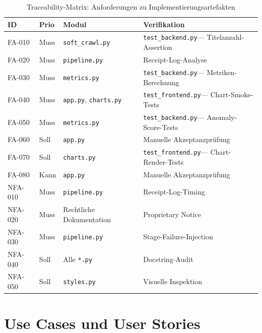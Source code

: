 \documentclass[12pt, a4paper, oneside]{report}
\newcommand{\code}[1]{\texttt{\small\textcolor{darknavy}{#1}}}
\begin{document}
\begin{table}[H]
\centering
\caption{Traceability-Matrix: Anforderungen zu Implementierungsartefakten}
\label{tab:traceability}
\small
\begin{tabularx}{\textwidth}{l l l X}
\toprule
\textbf{ID} & \textbf{Prio} & \textbf{Modul} & \textbf{Verifikation} \\
\midrule
FA-010 & Muss   & \code{soft\_crawl.py}             & \code{test\_backend.py}\;--- Titelanzahl-Assertion \\
FA-020 & Muss   & \code{pipeline.py}                & Receipt-Log-Analyse \\
FA-030 & Muss   & \code{metrics.py}                 & \code{test\_backend.py}\;--- Metriken-Berechnung \\
FA-040 & Muss   & \code{app.py}, \code{charts.py}   & \code{test\_frontend.py}\;--- Chart-Smoke-Tests \\
FA-050 & Muss   & \code{metrics.py}                 & \code{test\_backend.py}\;--- Anomaly-Score-Tests \\
FA-060 & Soll   & \code{app.py}                     & Manuelle Akzeptanzpr\"ufung \\
FA-070 & Soll   & \code{charts.py}                  & \code{test\_frontend.py}\;--- Chart-Render-Tests \\
FA-080 & Kann   & \code{app.py}                     & Manuelle Akzeptanzpr\"ufung \\
\midrule
NFA-010 & Muss  & \code{pipeline.py}                & Receipt-Log-Timing \\
NFA-020 & Muss  & Rechtliche Dokumentation           & Proprietary Notice \\
NFA-030 & Muss  & \code{pipeline.py}                & Stage-Failure-Injection \\
NFA-040 & Soll  & Alle \code{*.py}                  & Docstring-Audit \\
NFA-050 & Soll  & \code{styles.py}                  & Visuelle Inspektion \\
\bottomrule
\end{tabularx}
\end{table}


\chapter{Use Cases und User Stories}
\label{ch:usecases}
\end{document}
